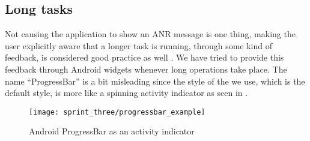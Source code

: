 \subsection{Long tasks}

Not causing the application to show an ANR message is one thing, making the user explicitly aware that a longer task is running, through some kind of feedback, is considered good practice as well \parencite{benyon}. We have tried to provide this feedback through Android  widgets whenever long operations take place. The name ``ProgressBar'' is a bit misleading since the style of the  we use, which is the default style, is more like a spinning activity indicator as seen in . 

\begin{figure}[!htbp]
        \centering
        \texttt{[image: sprint\_three/progressbar\_example]}
        \caption{Android ProgressBar as an activity indicator}
        \label{fig:activity_indicator}
\end{figure}